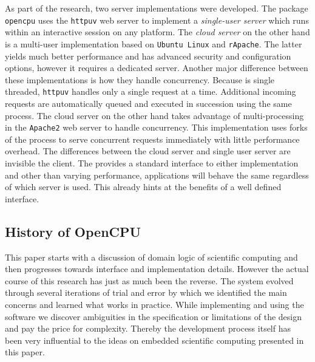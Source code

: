 As part of the research, two \OpenCPU server implementations were developed. The \R package \texttt{opencpu} uses the \texttt{httpuv} web server \citep{httpuv} to implement a \emph{single-user server} which runs within an interactive \R session on any platform. The \emph{cloud server} on the other hand is a multi-user implementation based on \texttt{Ubuntu Linux} and \texttt{rApache}. The latter yields much better performance and has advanced security and configuration options, however it requires a dedicated \Linux server. Another major difference between these implementations is how they handle concurrency. Because \R is single threaded, \texttt{httpuv} handles only a single request at a time. Additional incoming requests are automatically queued and executed in succession using the same process. The cloud server on the other hand takes advantage of multi-processing in the \texttt{Apache2} web server to handle concurrency. This implementation uses forks of the \R process to serve concurrent requests immediately with little performance overhead. The differences between the cloud server and single user server are invisible the client. The \API provides a standard interface to either implementation and other than varying performance, applications will behave the same regardless of which server is used. This already hints at the benefits of a well defined interface.


\subsection{History of OpenCPU}

This paper starts with a discussion of domain logic of scientific computing and then progresses towards interface and implementation details. However the actual course of this research has just as much been the reverse. The \OpenCPU system evolved through several iterations of trial and error by which we identified the main concerns and learned what works in practice. While implementing and using the software we discover ambiguities in the specification or limitations of the design and pay the price for complexity. Thereby the development process itself has been very influential to the ideas on embedded scientific computing presented in this paper. 

